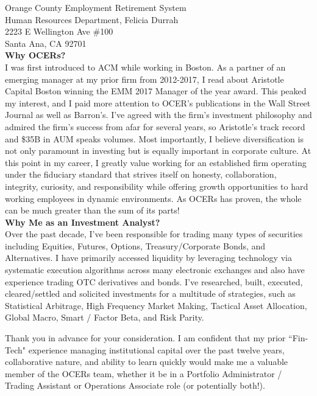 \documentclass[10pt]{letter}
\begin{document}
\begin{letter}{
  Orange County Employment Retirement System \\ 
  Human Resources Department, Felicia Durrah \\
  2223 E Wellington Ave \#100 \\
  Santa Ana, CA  92701 \\
}
\textbf{Why OCERs?} \\
I was first introduced to ACM while working in Boston.
As a partner of an emerging manager at my prior firm from 2012-2017, I read 
about Aristotle Capital Boston winning the EMM 2017 Manager of the year award.
This peaked my interest, and I paid more attention to OCER's publications in the Wall Street
Journal as well as Barron's. I've agreed with the firm's investment philosophy and
admired the firm's success from afar for several years, so Aristotle's track record
and \$35B in AUM speaks volumes. Most importantly, I believe diversification is not only paramount in investing but is equally important
in corporate culture. At this point in my career, I greatly value working for an established
firm operating under the fiduciary standard that strives itself on honesty, collaboration, integrity,
curiosity, and responsibility while offering growth opportunities to hard working
employees in dynamic environments. As OCERs has proven, the whole can be much greater
than the sum of its parts! \\ 

\textbf{Why Me as an Investment Analyst?} \\
Over the past decade, I've been responsible for trading many types of securities including
Equities, Futures, Options, Treasury/Corporate Bonds, and Alternatives.
I have primarily accessed liquidity by leveraging technology via
systematic execution algorithms across many electronic exchanges and also have experience
trading OTC derivatives and bonds. I've researched, built, executed, cleared/settled
and solicited investments for a multitude of strategies, such as Statistical Arbitrage,
High Frequency Market Making, Tactical Asset Allocation, Global Macro, Smart / Factor Beta,
and Risk Parity.


Thank you in advance for your consideration. I am confident that my prior ``Fin-Tech"
experience managing institutional capital over the past twelve years, collaborative nature,
and ability to learn quickly would make me a valuable member of the OCERs team,
whether it be in a Portfolio Administrator / Trading Assistant or Operations
Associate role (or potentially both!). \\


\end{letter}
\end{document}
